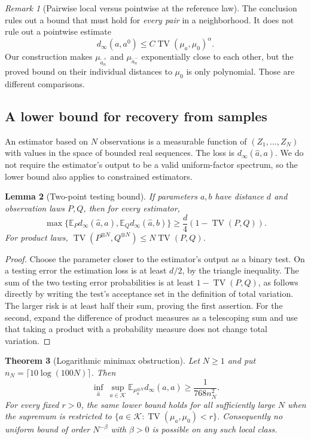 \documentclass[11pt,a4paper]{article}
\newtheorem{theorem}{Theorem}[section]
\newtheorem{lemma}[theorem]{Lemma}
\theoremstyle{definition}
\theoremstyle{remark}
\newtheorem{remark}[theorem]{Remark}
\DeclareMathOperator{\TV}{TV}
\newcommand{\E}{\mathbb E}
\newcommand{\K}{\mathcal K}
\begin{document}
\begin{remark}[Pairwise local versus pointwise at the reference law]
\label{rem:pointwise}
The conclusion rules out a bound that must hold for \emph{every pair}
in a neighborhood. It does not rule out a pointwise estimate
\[
 d_\infty(a,a^0)\le C\TV(\mu_a,\mu_0)^\alpha.
\]
Our construction makes $\mu_{\widetilde a_n^+}$ and
$\mu_{\widetilde a_n^-}$ exponentially close to each other, but the
proved bound on their individual distances to $\mu_0$ is only
polynomial. Those are different comparisons.
\end{remark}

\subsection{A lower bound for recovery from samples}

An estimator based on $N$ observations is a measurable function of
$(Z_1,\ldots,Z_N)$ with values in the space of bounded real sequences.
The loss is $d_\infty(\widehat a,a)$. We do not require the estimator's
output to be a valid uniform-factor spectrum, so the lower bound also
applies to constrained estimators.

\begin{lemma}[Two-point testing bound]\label{lem:two-point}
If parameters $a,b$ have distance $d$ and observation laws $P,Q$, then
for every estimator,
\[
 \max\{\E_Pd_\infty(\widehat a,a),\E_Qd_\infty(\widehat a,b)\}
       \ge\frac d4(1-\TV(P,Q)).
\]
For product laws, $\TV(P^{\otimes N},Q^{\otimes N})\le N\TV(P,Q)$.
\end{lemma}

\begin{proof}
Choose the parameter closer to the estimator's output as a binary test.
On a testing error the estimation loss is at least $d/2$, by the triangle
inequality. The sum of the two testing error probabilities is at least
$1-\TV(P,Q)$, as follows directly by writing the test's acceptance set
in the definition of total variation. The larger risk is at least half
their sum, proving the first assertion. For the second, expand the
difference of product measures as a telescoping sum and use that taking
a product with a probability measure does not change total variation.
\end{proof}

\begin{theorem}[Logarithmic minimax obstruction]\label{thm:statistics}
Let $N\ge1$ and put $n_N=\lceil10\log(100N)\rceil$. Then
\begin{equation}\label{eq:risk}
 \inf_{\widehat a}\ \sup_{a\in\K}
   \E_{\mu_a^{\otimes N}}d_\infty(\widehat a,a)
      \ge\frac1{768n_N^2}.
\end{equation}
For every fixed $r>0$, the same lower bound holds for all sufficiently
large $N$ when the supremum is restricted to
$\{a\in\K:\TV(\mu_a,\mu_0)<r\}$.
Consequently no uniform bound of order $N^{-\beta}$ with $\beta>0$ is
possible on any such local class.
\end{theorem}
\end{document}
